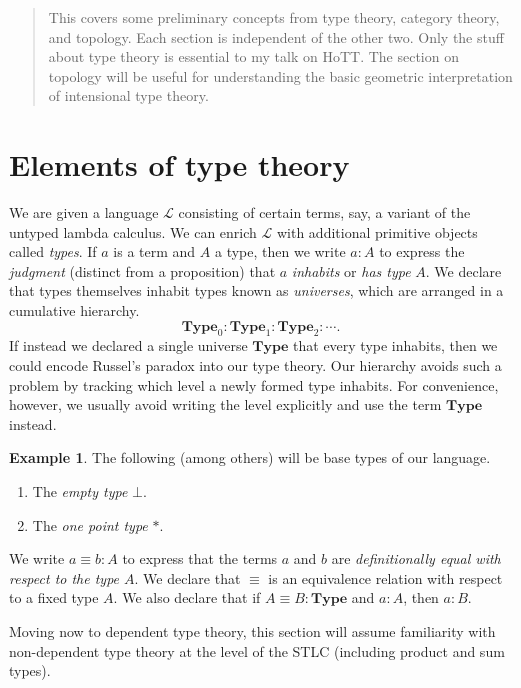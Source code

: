 \documentclass[10pt,letterpaper,cm]{nupset}
\theoremstyle{definition}
\newtheorem{exmp}[definition]{Example}
\theoremstyle{theorem}
\theoremstyle{remark}
\newcommand{\1}{\mathbf{1}}
\newcommand{\0}{\vec 0}
\begin{document}
\begin{abstract}
This covers some preliminary concepts from type theory, category theory, and topology. Each section is independent of the other two. Only the stuff about type theory is essential to my talk on HoTT. The section on topology will be useful for understanding the basic geometric interpretation of intensional type theory.
\end{abstract}

\tableofcontents
\newpage

\section{Elements of type theory}

We are given a language $\mathcal{L}$ consisting of certain terms, say, a variant of the untyped lambda calculus. We can enrich $\mathcal{L}$ with additional primitive objects called \textit{types}. If $a$ is a term and $A$ a type, then we write $a: A$ to express the \textit{judgment} (distinct from a proposition) that $a$ \textit{inhabits} or \textit{has type} $A$. We declare that types themselves inhabit types known as \textit{universes}, which are arranged in a cumulative hierarchy. $$\mathbf{Type}_0 :\mathbf{Type}_1 : \mathbf{Type}_2 : \cdots . $$ If instead we declared a single universe $\mathbf{Type}$ that every type inhabits, then we could encode Russel's paradox into our type theory. Our hierarchy avoids such a problem by tracking which level a newly formed type inhabits. For convenience, however, we usually avoid writing the level explicitly and use the term $\mathbf{Type}$ instead.
\begin{exmp} The following (among others) will be base types of our language.
\begin{enumerate}
\item The \textit{empty type} $\bot$.
\item The \textit{one point type} $\ast$.
\end{enumerate}
\end{exmp}
We write $a\equiv b :A$ to express that the terms $a$ and $b$ are \textit{definitionally equal with respect to the type $A$}. We declare that $\equiv$ is an equivalence relation with respect to a fixed type $A$. We also declare that if $A\equiv B : \mathbf{Type}$ and $a: A$, then $a:B$. 

Moving now to dependent type theory, this section will assume familiarity with non-dependent type theory at the level of the STLC (including product and sum types).
\end{document}
